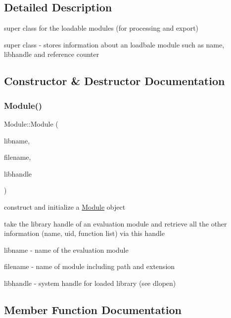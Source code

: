\subsection{Detailed Description}
super class for the loadable modules (for processing and export) 

super class -\/ stores information about an loadbale module such as name, libhandle and reference counter 

\subsection{Constructor \& Destructor Documentation}
\mbox{\label{classModule_a431b07620991847651303e0f252e8285}} 
\subsubsection{\texorpdfstring{Module()}{Module()}}
{\footnotesize\ttfamily Module\+::\+Module (\begin{DoxyParamCaption}\item[{string}]{libname,  }\item[{string}]{filename,  }\item[{\hyperlink{Module_8h_acbeb44869400b78e5f4097d5c49fc093}{lib\+Handle\+\_\+t}}]{libhandle }\end{DoxyParamCaption})}



construct and initialize a \hyperlink{classModule}{Module} object 

take the library handle of an evaluation module and retrieve all the other information (name, uid, function list) via this handle

\begin{DoxyItemize}
\item {\ttfamily libname} -\/ name of the evaluation module \item {\ttfamily filename} -\/ name of module including path and extension \item {\ttfamily libhandle} -\/ system handle for loaded library (see dlopen) \end{DoxyItemize}


\subsection{Member Function Documentation}
\mbox{\label{classModule_a3394d69c34f70e6d54fcebcb22c2a2c2}} 
